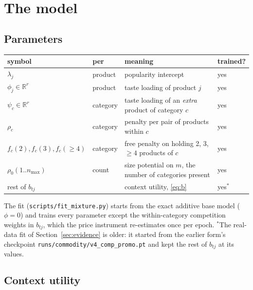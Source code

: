 \documentclass[11pt,a4paper]{article}
\theoremstyle{remark}
\newcommand{\R}{\mathbb R}
\begin{document}
\section{The model}

\subsection{Parameters}

\begin{center}\small
\begin{tabular}{lp{2cm}p{7.2cm}l}\toprule
symbol & per & meaning & trained?\\\midrule
$\lambda_j$ & product & popularity intercept & yes\\
$\phi_j\in\R^r$ & product & taste loading of product $j$ & yes\\
$\psi_c\in\R^r$ & category & taste loading of an \emph{extra} product of category $c$ & yes\\
$\rho_c$ & category & penalty per pair of products within $c$ & yes\\
$f_c(2),f_c(3),f_c(\ge4)$ & category & free penalty on holding 2, 3, $\ge4$ products of $c$ & yes\\
$\rho_0(1..n_{\max})$ & count & size potential on $m$, the number of categories present & yes\\
rest of $b_{tj}$ & & context utility, \eqref{eq:b} & yes${}^{*}$\\\bottomrule
\end{tabular}
\end{center}
The fit (\texttt{scripts/fit\_mixture.py}) starts from the exact additive base model ($\phi=0$) and trains
every parameter except the within-category competition weights in $b_{tj}$, which the price instrument
re-estimates once per epoch. ${}^{*}$The real-data fit of Section~\ref{sec:evidence} is older: it started from
the earlier form's checkpoint \texttt{runs/commodity/\allowbreak v4\_comp\_promo.pt} and kept the rest of
$b_{tj}$ at its values.

\subsection{Context utility}
\end{document}
